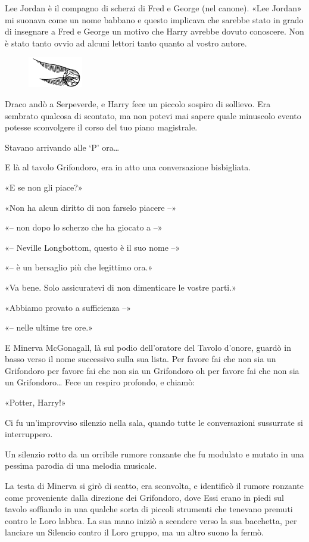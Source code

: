 Lee Jordan è il compagno di scherzi di Fred e George (nel canone). «Lee Jordan» mi suonava come un nome babbano e questo implicava che sarebbe stato in grado di insegnare a Fred e George un motivo che Harry avrebbe dovuto conoscere. Non è stato tanto ovvio ad alcuni lettori tanto quanto al vostro autore.

\begin{figure}[h]
	\includegraphics[scale=0.4]{boccino.png}
	\centering
\end{figure}

Draco andò a Serpeverde, e Harry fece un piccolo sospiro di sollievo. Era sembrato qualcosa di scontato, ma non potevi mai sapere quale minuscolo evento potesse sconvolgere il corso del tuo piano magistrale.

Stavano arrivando alle ‘P’ ora…

E là al tavolo Grifondoro, era in atto una conversazione bisbigliata.

«E se non gli piace?»

«Non ha alcun diritto di non farselo piacere –»

«– non dopo lo scherzo che ha giocato a –»

«– Neville Longbottom, questo è il suo nome –»

«– è un bersaglio più che legittimo ora.»

«Va bene. Solo assicuratevi di non dimenticare le vostre parti.»

«Abbiamo provato a sufficienza –»

«– nelle ultime tre ore.»

E Minerva McGonagall, là sul podio dell’oratore del Tavolo d’onore, guardò in basso verso il nome successivo sulla sua lista. Per favore fai che non sia un Grifondoro per favore fai che non sia un Grifondoro oh per favore fai che non sia un Grifondoro… Fece un respiro profondo, e chiamò:

«Potter, Harry!»

Ci fu un’improvviso silenzio nella sala, quando tutte le conversazioni sussurrate si interruppero.

Un silenzio rotto da un orribile rumore ronzante che fu modulato e mutato in una pessima parodia di una melodia musicale.

La testa di Minerva si girò di scatto, era sconvolta, e identificò il rumore ronzante come proveniente dalla direzione dei Grifondoro, dove Essi erano in piedi sul tavolo soffiando in una qualche sorta di piccoli strumenti che tenevano premuti contro le Loro labbra. La sua mano iniziò a scendere verso la sua bacchetta, per lanciare un Silencio contro il Loro gruppo, ma un altro suono la fermò.

